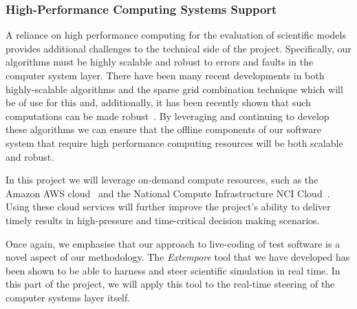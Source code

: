 \subsubsection*{High-Performance Computing Systems Support}

A reliance on high performance computing for the evaluation of
scientific models provides additional challenges to the technical side
of the project. Specifically, our algorithms must be highly scalable
and robust to errors and faults in the computer system layer. There
have been many recent developments in both highly-scalable algorithms
and the sparse grid combination technique which will be of use for
this and, additionally, it has been recently shown that such
computations can be made
robust~\parencite{HardingHLS2015,AliEtal2015,Ali11022016}. By leveraging and
continuing to develop these algorithms we can ensure that the
offline components of our software system that require high performance
computing resources will be both scalable and robust.

In this project we will leverage on-demand compute resources, such as
the Amazon AWS cloud~\parencite{amazonAws} and the National Compute
Infrastructure NCI Cloud~\parencite{nciCloud}. Using these cloud
services will further improve the project's ability to deliver timely
results in high-pressure and time-critical decision making scenarios.

Once again, we emphasise that our approach to live-coding of test
software is a novel aspect of our methodology. The \emph{Extempore}
tool that we have developed has been shown to be able to harness and
steer scientific simulation in real time. In this part of the project,
we will apply this tool to the real-time steering of the computer
systems layer itself.



